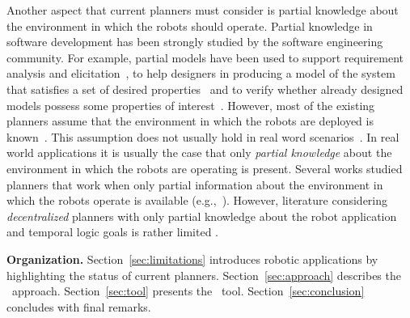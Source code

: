 Another aspect that current planners must consider is partial knowledge  about the environment in which the robots should operate.
Partial knowledge in software development has been strongly studied by the  software engineering community.
For example, partial models have been used to support requirement analysis and elicitation~\cite{menghi2017integrating,menghi2017cover,letier2008deriving}, to help designers in producing a model of the system that satisfies a set of desired properties~\cite{uchitel2009synthesis,uchitel2013supporting,famelis2012partial,albarghouthi2012under} and to verify whether  already designed models possess some properties of interest~\cite{menghi2016dealing,bruns1999model,chechik2004multi}.
However, most of the existing planners assume that the environment in which the robots are deployed is known~\cite{7139412}. 
This assumption does not usually hold in real word scenarios~\cite{lahijanian2016iterative}.
In real world applications it is usually the case that only \emph{partial knowledge} about the environment in which the robots are operating is present.
Several works studied planners that work when only partial information about the environment in which the robots operate is available (e.g.,~\cite{roy2006planning,du2012robot,diaz2001exploring}).
However, %
literature considering \emph{decentralized} planners %
with only partial knowledge about the robot application and temporal logic goals
is rather limited \cite{guo2015multi}.


\textbf{Organization.} 
Section~\ref{sec:limitations} introduces robotic applications by highlighting the status of current planners.
Section~\ref{sec:approach} describes the \toolName\ approach.
Section~\ref{sec:tool} presents the \toolName\ tool.
Section~\ref{sec:conclusion} concludes with final remarks.